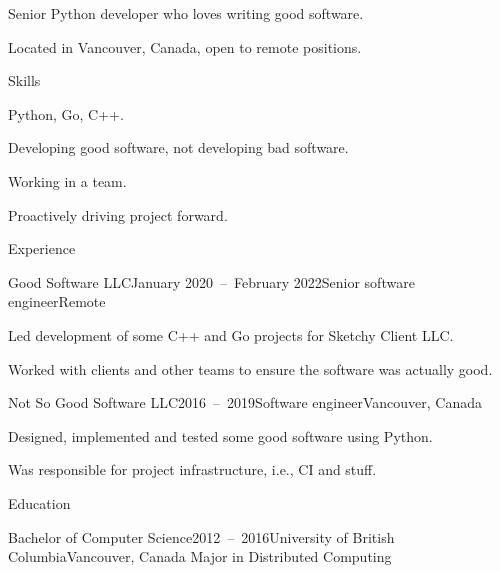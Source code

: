\documentclass{resume}
\begin{document}
    Senior Python developer who loves writing good software.

    Located in Vancouver, Canada, open to remote positions.

    \begin{rSection}{Skills}
        \begin{rSubsection}{}{}{}{}
            \item
                Python, Go, C++.
            \item
                Developing good software, not developing bad software.
        \end{rSubsection}
        \begin{rSubsection}{}{}{}{}
            \item
                Working in a team.
            \item
                Proactively driving project forward.
        \end{rSubsection}
    \end{rSection}

    \begin{rSection}{Experience}
        \begin{rSubsection}{Good Software LLC}{January 2020~--~February 2022}{Senior software engineer}{Remote}
            \item
                Led development of some C++ and Go projects for Sketchy Client LLC\@.
            \item
                Worked with clients and other teams to ensure the software was actually good.
        \end{rSubsection}
        \begin{rSubsection}{Not So Good Software LLC}{2016~--~2019}{Software engineer}{Vancouver, Canada}
            \item
                Designed, implemented and tested some good software using Python.
            \item
                Was responsible for project infrastructure, i.e., CI and stuff.
        \end{rSubsection}
    \end{rSection}

    \begin{rSection}{Education}
        \begin{rSubsection}{Bachelor of Computer Science}{2012~--~2016}{University of British Columbia}{Vancouver, Canada}
            Major in Distributed Computing
        \end{rSubsection}
    \end{rSection}
\end{document}
